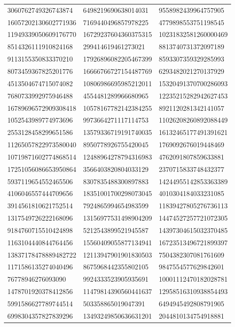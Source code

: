 \begin{longtable}{*{3}{l}}
3060762749326743874&6498219690638014031&9558982439964757905\\
16057202130602771936&7169440496857978225&4779898553751198545\\
11949339050609176770&16729237604360375315&10231832581260000469\\
8514326111910824168&299414619461273021&8813740731372097189\\
9113155350833370210&17926896082205467399&8593307359329285993\\
8073459367825201776&16666766727154487769&6293482021270137929\\
4513504674715074082&10806986695985212011&15320491370700286093\\
7680733992975946488&4554481289966680965&12235215282942627453\\
16789696572909308418&10578167782142384255&8921120281342141057\\
1052543989774973696&9973664271117114753&11026208260892088449\\
2553128458299651586&13579336719191740035&16132465177491391621\\
11265057822973580040&8950778926755420045&1769092676019448469\\
10719871602774868514&12488964278794316983&4762091807859633881\\
17251056086653950864&3566403820804033129&2370715833748432377\\
5937119654552465506&8307835488300897883&14244955142853363389\\
4106046557444709656&18351001700298073045&4010304184033231085\\
3914561810621752514&7924865994654983599&11839427805276736113\\
1317549726222168096&13156977531498904209&14474527257721072305\\
9184760715510424898&5212543899521945587&14397304615032370485\\
1163104440844764456&15560409055877134941&16723513496721899397\\
13837178478889482722&12113947901901830503&7504382307081761609\\
1171586135274040496&8675968442355802105&9847554577629842601\\
76778946276093090&9924333523905935691&10001112470182028781\\
1478701920378412856&11479814390560441637&12958516310938854493\\
5991586627789744514&503358865019047391&6494945492808791905\\
6998304357827839296&13493249850636631201&2044810134754918881\\

\end{longtable}
